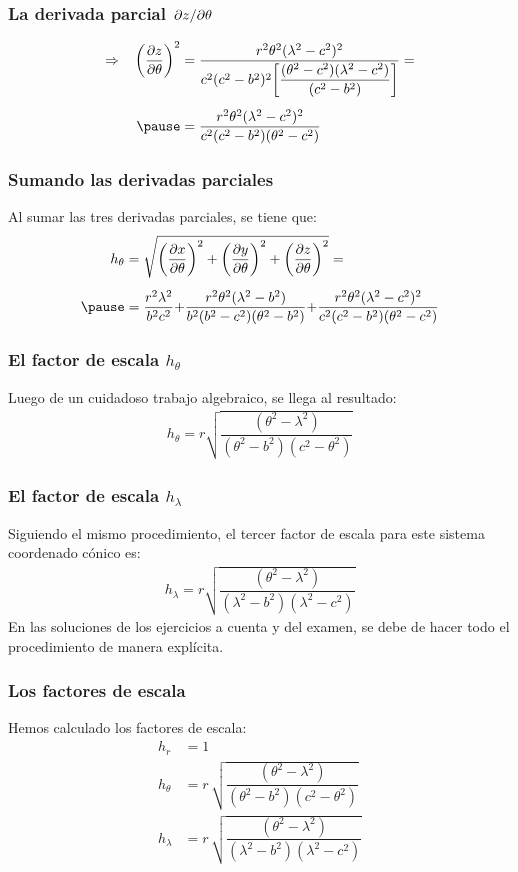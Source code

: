 \documentclass[12pt]{beamer}
\begin{document}
\begin{frame}
\frametitle{La derivada parcial $\pdv*{z}{\theta}$}
\begin{eqnarray*}
\begin{aligned}
\Rightarrow \hspace{0.3cm} \bigg( \pdv{z}{\theta} \bigg)^{2} &= \dfrac{r^{2} \theta^{2} (\lambda^{2} - c^{2})^{2}}{c^{2} (c^{2} - b^{2})^{2} \bigg[ \dfrac{(\theta^{2} - c^{2})(\lambda^{2} - c^{2})}{(c^{2} - b^{2})} \bigg]} = \\[0.5em] \pause
&= \dfrac{r^{2} \theta^{2} (\lambda^{2} - c^{2})^{2}}{c^{2} (c^{2} - b^{2}) (\theta^{2} - c^{2})}
\end{aligned}
\end{eqnarray*}
\end{frame}
\begin{frame}
\frametitle{Sumando las derivadas parciales}
Al sumar las tres derivadas parciales, se tiene que:
\pause
\begin{eqnarray*}
\begin{aligned}
h_{\theta} &= \sqrt{\bigg( \pdv{x}{\theta} \bigg)^{2} + \bigg( \pdv{y}{\theta} \bigg)^{2} + \bigg( \pdv{z}{\theta} \bigg)^{2}} = \\[0.5em] \pause
&= \dfrac{r^{2} \lambda^{2}}{b^{2} c^{2}} {+} \dfrac{r^{2} \theta^{2} (\lambda^{2} - b^{2})}{b^{2} (b^{2} - c^{2}) (\theta^{2} - b^{2})} {+} \dfrac{r^{2} \theta^{2} (\lambda^{2} - c^{2})^{2}}{c^{2} (c^{2} - b^{2}) (\theta^{2} - c^{2})}
\end{aligned}
\end{eqnarray*}
\end{frame}
\begin{frame}
\frametitle{El factor de escala $h_{\theta}$}
Luego de un cuidadoso trabajo algebraico, se llega al resultado:
\pause
\begin{align*}
h_{\theta} = r \sqrt{\dfrac{(\theta^{2} - \lambda^{2})}{(\theta^{2} - b^{2})(c^{2} - \theta^{2})}}
\end{align*}
\end{frame}
\begin{frame}
\frametitle{El factor de escala $h_{\lambda}$}
Siguiendo el mismo procedimiento, el tercer factor de escala para este sistema coordenado cónico es:
\pause
\begin{align*}
h_{\lambda} = r \sqrt{\dfrac{(\theta^{2} - \lambda^{2})}{(\lambda^{2} - b^{2})(\lambda^{2} - c^{2})}}
\end{align*}
\pause
En las soluciones de los ejercicios a cuenta y del examen, se debe de hacer todo el procedimiento de manera explícita.
\end{frame}
\begin{frame}
\frametitle{Los factores de escala}
Hemos calculado los factores de escala:
\pause
\begin{align*}
h_{r} &= 1 \\[0.5em]
h_{\theta} &=  r \, \sqrt{\dfrac{(\theta^{2} - \lambda^{2})}{(\theta^{2} - b^{2})(c^{2} - \theta^{2})}} \\[0.5em]
h_{\lambda} &= r \, \sqrt{\dfrac{(\theta^{2} - \lambda^{2})}{(\lambda^{2} - b^{2})(\lambda^{2} - c^{2})}}
\end{align*}
\end{frame}
\end{document}

